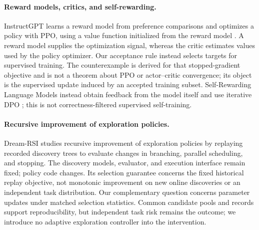 \paragraph{Reward models, critics, and self-rewarding.}
InstructGPT learns a reward model from preference comparisons and optimizes a
policy with PPO, using a value function initialized from the reward model
\citep{ouyang2022instructgpt}. A reward model supplies the optimization signal,
whereas the critic estimates values used by the policy optimizer. Our
acceptance rule instead selects targets for supervised training. The
counterexample is derived for that stopped-gradient objective and is not a
theorem about PPO or actor--critic convergence; its object is the supervised
update induced by an accepted training subset.
Self-Rewarding Language Models instead obtain feedback from the model
itself and use iterative DPO \citep{yuan2024selfrewarding}; this is not
correctness-filtered supervised self-training.

\paragraph{Recursive improvement of exploration policies.}
Dream-RSI \citep{zheng2026dreamrsi} studies recursive improvement of exploration
policies by replaying recorded discovery trees to evaluate changes in
branching, parallel scheduling, and stopping. The discovery models,
evaluator, and execution interface remain fixed; policy code changes.
Its selection guarantee concerns the fixed historical replay objective,
not monotonic improvement on new online discoveries or an independent
task distribution. Our complementary question concerns parameter updates
under matched selection statistics. Common candidate pools and records
support reproducibility, but independent task risk remains the outcome;
we introduce no adaptive exploration controller into the intervention.
